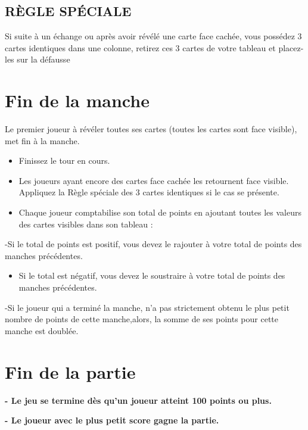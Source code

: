 \documentclass{article}%
\begin{document}
%
\subsection{ RÈGLE SPÉCIALE
}%
\label{subsec:RGLESPCIALE}%
Si suite à un échange ou après avoir révélé une carte face cachée, vous possédez 3 cartes identiques dans une
%
colonne, retirez ces 3 cartes de votre tableau et placez{-}les sur la défausse


%
\section{ Fin de la manche
}%
\label{sec:Findelamanche}%
Le premier joueur à révéler toutes ses cartes (toutes les cartes sont face visible), met fin à la manche.
%
\begin{itemize}%
\item%
%
 Finissez le tour en cours.
%
\item%
%
 Les joueurs ayant encore des cartes face cachée les retournent face visible. Appliquez la Règle spéciale des 3 cartes identiques si le cas se présente.
%
\item%
%
 Chaque joueur comptabilise son total de points en ajoutant toutes les valeurs des cartes visibles dans son tableau :
%
\end{itemize}%
{-}Si le total de points est positif, vous devez le rajouter à votre total de points des manches précédentes.
%
\begin{itemize}%
\item%
%
 Si le total est négatif, vous devez le soustraire à votre total de points des manches précédentes.
%
\end{itemize}%
{-}Si le joueur qui a terminé la manche, n’a pas strictement obtenu le plus petit nombre de points de cette manche,alors, la somme de ses points pour cette manche est doublée.


%
\section{ Fin de la partie
}%
\label{sec:Findelapartie}%
\textbf{{-} Le jeu se termine dès qu’un joueur atteint 100 points ou plus.}%

%
\textbf{{-} Le joueur avec le plus petit score gagne la partie.}

%
\end{document}
